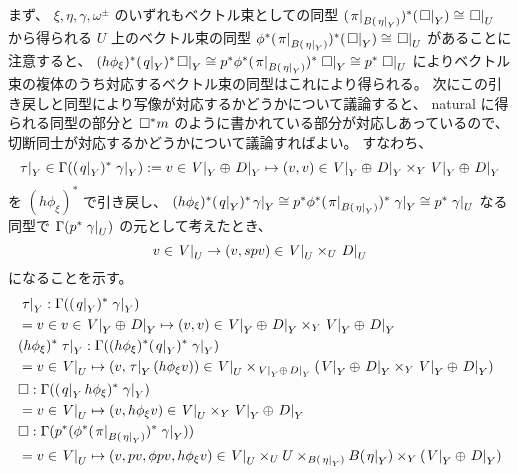 \begin{Proof}
  まず、 \(\xi, \eta, \gamma, \omega^{\pm}\) のいずれもベクトル束としての同型 \((\left. {\pi} \right| _{B(\left. {\eta} \right| _{Y})})^* ({\left. {\square} \right| _{Y}}) \cong \left. {\square} \right| _{U}\) から得られる \(U\) 上のベクトル束の同型 \(\phi^* (\left. {\pi} \right| _{B(\left. {\eta} \right| _{Y})})^* ({\left. {\square} \right| _{Y}}) \cong \left. {\square} \right| _{U}\) があることに注意すると、 \((h \phi_{\xi})^* (\left. {q} \right| _{Y})^* {\left. {\square} \right| _{Y}} \cong p^* \phi^* (\left. {\pi} \right| _{B(\left. {\eta} \right| _{Y})})^* \left. {\square} \right| _{Y} \cong p^* \left. {\square} \right| _{U}\) によりベクトル束の複体のうち対応するベクトル束の同型はこれにより得られる。
  次にこの引き戻しと同型により写像が対応するかどうかについて議論すると、 natural に得られる同型の部分と \(\square ^* m\) のように書かれている部分が対応しあっているので、切断同士が対応するかどうかについて議論すればよい。
  すなわち、
  \[
    \left. {\tau} \right| _{Y} \in \Gamma((\left. {q} \right| _{Y})^* \left. {\gamma} \right| _{Y}) := v \in \left. {V} \right| _{Y} \oplus \left. {D} \right| _{Y} \mapsto (v,v) \in \left. {V} \right| _{Y} \oplus \left. {D} \right| _{Y} \times_{Y} \left. {V} \right| _{Y} \oplus \left. {D} \right| _{Y}
  \]
  を \((h \phi_{\xi})^*\) で引き戻し、 \((h \phi_{\xi})^* (\left. {q} \right| _{Y})^* {\left. {\gamma} \right| _{Y}} \cong p^* \phi^* (\left. {\pi} \right| _{B(\left. {\eta} \right| _{Y})})^* \left. {\gamma} \right| _{Y} \cong p^* \left. {\gamma} \right| _{U}\) なる同型で \(\Gamma(p^* \left. {\gamma} \right| _{U})\) の元として考えたとき、
  \[
    v \in \left. {V} \right| _{U} \to (v, spv) \in \left. {V} \right| _{U} \times_{U} \left. {D} \right| _{U}
  \]
  になることを示す。
  \begin{align*}
    &\restr{\tau}{Y} : \Gamma((\restr{q}{Y})^* \restr{\gamma}{Y}) \\
    &= v \in v \in \restr{V}{Y} \oplus \restr{D}{Y} \mapsto (v,v) \in \restr{V}{Y} \oplus \restr{D}{Y} \times_{Y} \restr{V}{Y} \oplus \restr{D}{Y} \\
    &(h \phi_{\xi})^* \restr{\tau}{Y} : \Gamma((h \phi_{\xi})^* (\restr{q}{Y})^* \restr{\gamma}{Y}) \\
    &= v \in \restr{V}{U} \mapsto (v, \restr{\tau}{Y} (h \phi_{\xi} v)) \in \restr{V}{U} \times_{\restr{V}{Y} \oplus \restr{D}{Y}} (\restr{V}{Y} \oplus \restr{D}{Y} \times_{Y} \restr{V}{Y} \oplus \restr{D}{Y}) \\
    &\place : \Gamma((\restr{q}{Y} h \phi_{\xi})^* \restr{\gamma}{Y}) \\
    &= v \in \restr{V}{U} \mapsto (v, h \phi_{\xi} v) \in \restr{V}{U} \times_{Y} \restr{V}{Y} \oplus \restr{D}{Y} \\
    &\place : \Gamma(p^* (\phi^* (\restr{\pi}{B(\restr{\eta}{Y})})^* \restr{\gamma}{Y})) \\
    &= v \in \restr{V}{U} \mapsto (v, p v, \phi p v, h \phi_{\xi} v) \in \restr{V}{U} \times_{U} U \times_{B(\restr{\eta}{Y})} B(\restr{\eta}{Y}) \times_{Y} (\restr{V}{Y} \oplus \restr{D}{Y}) \\

\end{align*}
\end{Proof}
